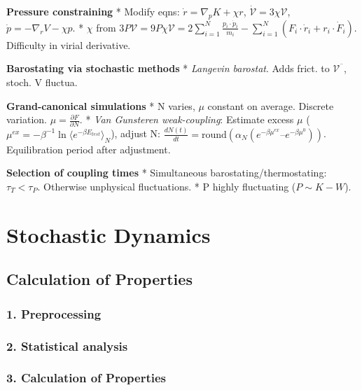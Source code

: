 \documentclass{article}
\begin{document}
\textbf{Pressure constraining} * Modify eqns: \(\dot{r} = \nabla_{p}K + \chi r\), \(\dot{\mathcal{V}} = 3\chi\mathcal{V}\), \(\dot{p} = - \nabla_{r}V - \chi p\). * \(\chi\) from \(3P\mathcal{V} = 9P\chi\mathcal{V} = 2\sum_{i = 1}^{N}\frac{p_{i} \cdot {\dot{p}}_{i}}{m_{i}} - \sum_{i = 1}^{N}\left( F_{i} \cdot {\dot{r}}_{i} + r_{i} \cdot {\dot{F}}_{i} \right)\). Difficulty in virial derivative.



\textbf{Barostating via stochastic methods} * \textit{Langevin barostat}. Adds frict. to \(\mathcal{V}^{¨}\), stoch. V fluctua.

\textbf{Grand-canonical simulations} * N varies, \(\mu\) constant on average. Discrete variation. \(\mu = \frac{\partial F}{\partial N}\). * \textit{Van Gunsteren weak-coupling}: Estimate excess \(\mu\) (\(\mu^{ex} = - \beta^{- 1}\ln\langle e^{- \beta E_{test}}\rangle_{N}\)), adjust N: \(\frac{dN(t)}{dt} = \mathrm{\text{round}}\left( \alpha_{N}\left( e^{- \beta\mu^{ex}}–e^{- \beta\mu^{0}} \right) \right)\). Equilibration period after adjustment.

\textbf{Selection of coupling times} * Simultaneous barostating/thermostating: \(\tau_{T} < \tau_{P}\). Otherwise unphysical fluctuations. * P highly fluctuating (\(P \sim K - W\)).



\section{Stochastic Dynamics}\label{stochastic-dynamics}   \subsection{Calculation of Properties}\label{analysis-of-properties}  

\subsubsection{1. Preprocessing}\label{preprocessing}   

\subsubsection{2. Statistical analysis}\label{statistical-analysis}      

\subsubsection{3. Calculation of Properties}\label{types-of-properties}     
\end{document}
